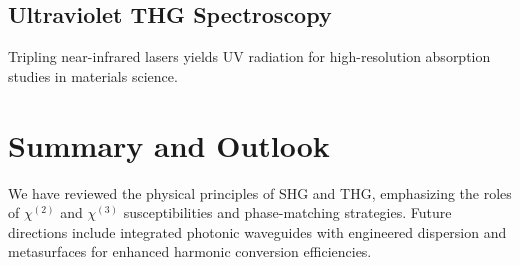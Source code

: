 \documentclass[12pt,a4paper]{article}
\begin{document}
\subsection{Ultraviolet THG Spectroscopy}
Tripling near-infrared lasers yields UV radiation for high-resolution absorption studies in materials science.

\section{Summary and Outlook}
We have reviewed the physical principles of SHG and THG, emphasizing the roles of $\chi^{(2)}$ and $\chi^{(3)}$ susceptibilities and phase-matching strategies. Future directions include integrated photonic waveguides with engineered dispersion and metasurfaces for enhanced harmonic conversion efficiencies.
\end{document}
